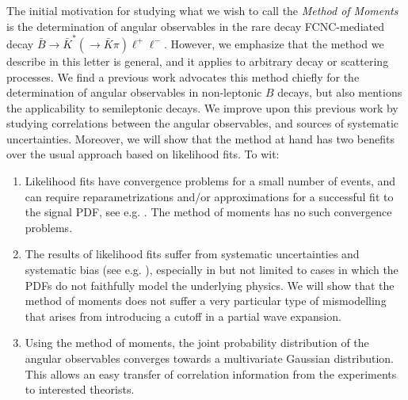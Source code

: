 \documentclass[aps,prd,reprint,nofootinbib,preprintnumbers]{revtex4}
\begin{document}
The initial motivation for studying what we wish to call the \emph{Method of Moments}
is the determination of angular observables in the rare decay FCNC-mediated decay
$\bar{B}\to \bar{K}^*(\to \bar{K}\pi)\ell^+\ell^-$. However, we emphasize that
the method we describe in this letter is general, and it applies to arbitrary
decay or scattering processes. We find a previous work \cite{Dighe:1998vk}
advocates this method chiefly for the determination of angular observables in non-leptonic
$B$ decays, but also mentions the applicability to semileptonic decays. We improve
upon this previous work by studying correlations between the angular observables,
and sources of systematic uncertainties. Moreover, we will show that the method
at hand has two benefits over the usual approach based on likelihood fits. To wit:
\begin{enumerate}
    \item Likelihood fits have convergence problems for a small number of
        events, and can require reparametrizations and/or approximations
        for a successful fit to the signal PDF, see e.g. \cite{Egede:2008uy}.
        The method of moments has no such convergence problems.
    \item The results of likelihood fits suffer from systematic uncertainties
        and systematic bias (see e.g. \cite{Egede:2008uy}), especially in but not limited
        to cases in which the PDFs do not faithfully model the underlying physics. We will
        show that the method of moments does not suffer a very particular type of
        mismodelling that arises from introducing a cutoff in a partial wave expansion.
    \item Using the method of moments, the joint probability distribution of the
        angular observables converges towards a multivariate Gaussian distribution.
        This allows an easy transfer of correlation information from the experiments to
        interested theorists.
\end{enumerate}
\end{document}

